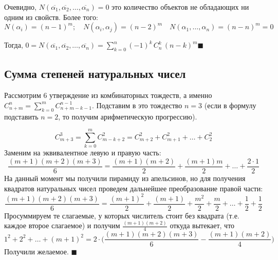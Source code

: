 Очевидно, $N(\overline{\alpha_1}, \overline{\alpha_2},\ldots, \overline{\alpha_n}) = 0$ это количество объектов не обладающих ни одним из свойств. \newline Более того: $N(\alpha_i)=(n-1)^m; \quad N(\alpha_i, \alpha_j)=(n-2)^m \quad N(\alpha_1, \ldots, \alpha_n)=(n-n)^m = 0$ 


Тогда, $0 = N(\overline{\alpha_1}, \overline{\alpha_2},\ldots, \overline{\alpha_n}) = \sum_{k=0}^n(-1)^k\,C_n^k\,(n-k)^m$\quad $\blacksquare$
\subsection*{Сумма степеней натуральных чисел}


Рассмотрим 6 утверждение из комбинаторных тождеств, а именно $C_{n+m}^n = \sum_{k=0}^mC_{n+m-k-1}^{n-1}$. Подставим в это тождество $n=3$ (если в формулу подставить $n=2$, то получим арифметическую прогрессию).


$$C_{m+3}^3 = \sum_{k=0}^mC_{m-k+2}^{2} = C_{m+2}^2+C_{m+1}^2+\ldots+C_2^2$$
Заменим на эквивалентное левую и правую часть:
$$\frac{(m+1)(m+2)(m+3)}{6} = \frac{(m+1)(m+2)}{2} + \frac{(m+1)m}{2} + \ldots + \frac{2\cdot1}{2}$$
На данный момент мы получили пирамиду из апельсинов, но для получения квадратов натуральных чисел проведем дальнейшее преобразование правой части:
$$\frac{(m+1)(m+2)(m+3)}{6} = \frac{(m+1)^2}{2} + \frac{(m+1)}{2} + \frac{m^2}{2} + \frac{m}{2} + \ldots + \frac{1}{2} + \frac{1}{2}$$
Просуммируем те слагаемые, у которых числитель стоит без квадрата (т.е. каждое второе слагаемое) и получим $\frac{(m+1)(m+2)}{4}$ откуда вытекает, что 
$$1^2+2^2+\ldots+(m+1)^2 = 2\cdot\Big(\frac{(m+1)(m+2)(m+3)}{6} - \frac{(m+1)(m+2)}{4}\Big)$$
Получили желаемое. \quad $\blacksquare$